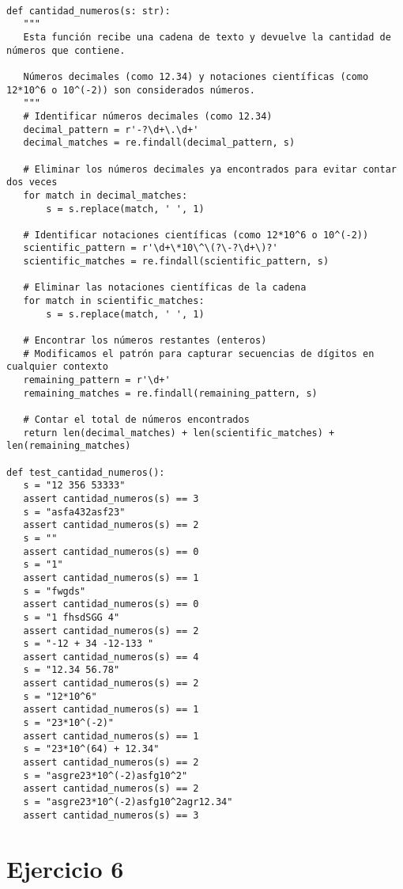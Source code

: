 \begin{lstlisting}[caption={Solución que incluye números decimales y notaciones científicas}]
      
def cantidad_numeros(s: str):
   """
   Esta función recibe una cadena de texto y devuelve la cantidad de números que contiene.
   
   Números decimales (como 12.34) y notaciones científicas (como 12*10^6 o 10^(-2)) son considerados números.
   """
   # Identificar números decimales (como 12.34)
   decimal_pattern = r'-?\d+\.\d+'
   decimal_matches = re.findall(decimal_pattern, s)
   
   # Eliminar los números decimales ya encontrados para evitar contar dos veces
   for match in decimal_matches:
       s = s.replace(match, ' ', 1)
   
   # Identificar notaciones científicas (como 12*10^6 o 10^(-2))
   scientific_pattern = r'\d+\*10\^\(?\-?\d+\)?'
   scientific_matches = re.findall(scientific_pattern, s)
   
   # Eliminar las notaciones científicas de la cadena
   for match in scientific_matches:
       s = s.replace(match, ' ', 1)
   
   # Encontrar los números restantes (enteros)
   # Modificamos el patrón para capturar secuencias de dígitos en cualquier contexto
   remaining_pattern = r'\d+'
   remaining_matches = re.findall(remaining_pattern, s)
   
   # Contar el total de números encontrados
   return len(decimal_matches) + len(scientific_matches) + len(remaining_matches)

def test_cantidad_numeros():
   s = "12 356 53333"
   assert cantidad_numeros(s) == 3
   s = "asfa432asf23"
   assert cantidad_numeros(s) == 2
   s = ""
   assert cantidad_numeros(s) == 0
   s = "1"
   assert cantidad_numeros(s) == 1
   s = "fwgds"
   assert cantidad_numeros(s) == 0
   s = "1 fhsdSGG 4"
   assert cantidad_numeros(s) == 2
   s = "-12 + 34 -12-133 "
   assert cantidad_numeros(s) == 4
   s = "12.34 56.78"
   assert cantidad_numeros(s) == 2
   s = "12*10^6"
   assert cantidad_numeros(s) == 1
   s = "23*10^(-2)"
   assert cantidad_numeros(s) == 1
   s = "23*10^(64) + 12.34"
   assert cantidad_numeros(s) == 2
   s = "asgre23*10^(-2)asfg10^2"
   assert cantidad_numeros(s) == 2
   s = "asgre23*10^(-2)asfg10^2agr12.34"
   assert cantidad_numeros(s) == 3
\end{lstlisting}

\newpage
\section{Ejercicio 6}

